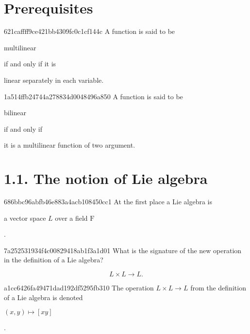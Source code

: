 


\section{Prerequisites}
\begin{note}{621caffff9ce421bb4309fc0c1cf144c}
    A function is said to be \begin{icloze}{2}multilinear\end{icloze} if and only if it is \begin{icloze}{1}linear separately in each variable.\end{icloze}
\end{note}

\begin{note}{1a514ffb24744a278834d0048496a850}
    A function is said to be \begin{icloze}{2}bilinear\end{icloze} if and only if \begin{icloze}{1}it is a multilinear function of two argument.\end{icloze}
\end{note}

\section{1.1. The notion of Lie algebra}
\begin{note}{686bbc96abfb46e883a4acb108450cc1}
    At the first place a Lie algebra is \begin{icloze}{1}a vector space \( L \)
    over a field \( \mathrm F \)\end{icloze}.
\end{note}

\begin{note}{7a252531934f4c00829418ab1f3a1d01}
    What is the signature of the new operation in the definition of a Lie
    algebra?

    \begin{cloze}{1}
        \[
            L \times L \to L.
        \]
    \end{cloze}
\end{note}

\begin{note}{a1cc6426fa49471dad192df5295fb310}
    The operation \( L \times L \to L \) from the definition of a Lie algebra is
    denoted \begin{icloze}{1}\( (x, y) \mapsto [xy] \)\end{icloze}.
\end{note}

